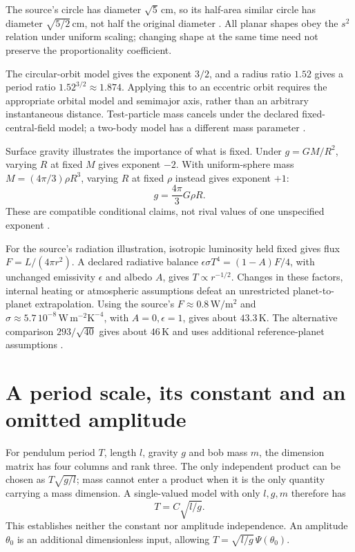 The source's circle has diameter \(\sqrt5\,\mathrm{cm}\), so its half-area
similar circle has diameter \(\sqrt{5/2}\,\mathrm{cm}\), not half the original
diameter \cite[4.2.1]{Mahajan2014Insight}.
All planar shapes obey the \(s^2\) relation under uniform scaling; changing
shape at the same time need not preserve the proportionality coefficient.

The circular-orbit model gives the exponent \(3/2\), and a radius ratio
\(1.52\) gives a period ratio \(1.52^{3/2}\approx1.874\).
Applying this to an eccentric orbit requires the appropriate orbital model
and semimajor axis, rather than an arbitrary instantaneous distance.
Test-particle mass cancels under the declared fixed-central-field model;
a two-body model has a different mass parameter \cite[4.2.2]{Mahajan2014Insight}.

Surface gravity illustrates the importance of what is fixed. Under
\(g=GM/R^2\), varying \(R\) at fixed \(M\) gives exponent \(-2\).
With uniform-sphere mass \(M=(4\pi/3)\rho R^3\), varying \(R\) at fixed
\(\rho\) instead gives exponent \(+1\):
\[
 g=\frac{4\pi}3G\rho R.
\]
These are compatible conditional claims, not rival values of one unspecified
exponent \cite[4.2.4]{Mahajan2014Insight}.

For the source's radiation illustration, isotropic luminosity held fixed
gives flux \(F=L/(4\pi r^2)\). A declared radiative balance
\(\epsilon\sigma T^4=(1-A)F/4\), with unchanged emissivity \(\epsilon\)
and albedo \(A\), gives \(T\propto r^{-1/2}\).
Changes in these factors, internal heating or atmospheric assumptions defeat
an unrestricted planet-to-planet extrapolation.
Using the source's \(F\approx0.8\,\mathrm{W/m^2}\) and
\(\sigma\approx5.7\,10^{-8}\,\mathrm{W\,m^{-2}K^{-4}}\), with
\(A=0,\epsilon=1\), gives about \(43.3\,\mathrm K\).
The alternative comparison \(293/\sqrt{40}\) gives about \(46\,\mathrm K\)
and uses additional reference-planet assumptions
\cite[4.2.1]{Mahajan2014Insight}.

\section{A period scale, its constant and an omitted amplitude}
\label{sec:p15-dimensional-pendulum}

For pendulum period \(T\), length \(l\), gravity \(g\) and bob mass \(m\),
the dimension matrix has four columns and rank three. The only independent
product can be chosen as \(T\sqrt{g/l}\); mass cannot enter a product when
it is the only quantity carrying a mass dimension.
A single-valued model with only \(l,g,m\) therefore has
\[
 T=C\sqrt{l/g}.
\]
This establishes neither the constant nor amplitude independence.
An amplitude \(\theta_0\) is an additional dimensionless input, allowing
\(T=\sqrt{l/g}\,\Psi(\theta_0)\).

